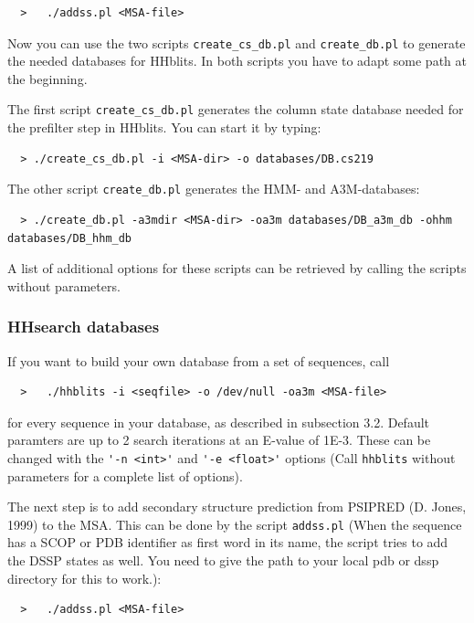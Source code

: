 \documentclass[11pt,a4paper]{article}
\begin{document}
\begin{verbatim}
  >   ./addss.pl <MSA-file>
\end{verbatim}

Now you can use the two scripts \verb`create_cs_db.pl` and \verb`create_db.pl` to generate the
needed databases for HHblits. In both scripts you have to adapt some path at the beginning.

The first script \verb`create_cs_db.pl` generates the column state database needed for the 
prefilter step in HHblits. You can start it by typing:

\begin{verbatim}
  > ./create_cs_db.pl -i <MSA-dir> -o databases/DB.cs219
\end{verbatim}

The other script \verb`create_db.pl` generates the HMM- and A3M-databases:

\begin{verbatim}
  > ./create_db.pl -a3mdir <MSA-dir> -oa3m databases/DB_a3m_db -ohhm databases/DB_hhm_db
\end{verbatim}

A list of additional options for these scripts can be retrieved by calling the scripts without 
parameters.

\subsubsection{HHsearch databases}

If you want to build your own database from a set of sequences, call 
\begin{verbatim}
  >   ./hhblits -i <seqfile> -o /dev/null -oa3m <MSA-file>
\end{verbatim}

for every sequence in your database, as described in subsection 3.2. Default paramters 
are up to 2 search iterations at an E-value of 1E-3. These can be changed with the 
\verb`'-n <int>'` and \verb`'-e <float>'` options (Call \verb`hhblits` without parameters for a 
complete list of options). 

The next step is to add secondary structure prediction from PSIPRED (D. Jones, 1999) to the
MSA. This can be done by the script \verb`addss.pl` (When the sequence has a SCOP or PDB identifier as first word 
in its name, the script tries to add the DSSP states as well. You need to give the 
path to your local pdb or dssp directory for this to work.):

\begin{verbatim}
  >   ./addss.pl <MSA-file>
\end{verbatim}
\end{document}

